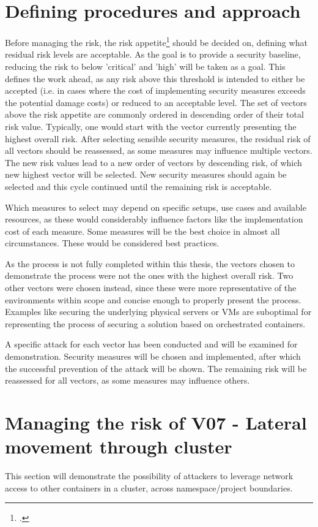\section{Defining procedures and approach} \label{riskMgmtApproach}
Before managing the risk, the risk appetite\footcite[][, first paragraph]{riskAppetite} should be decided on, defining what residual risk levels are acceptable.
As the goal is to provide a security baseline, reducing the risk to below 'critical' and 'high' will be taken as a goal.
This defines the work ahead, as any risk above this threshold is intended to either be accepted (i.e. in cases where the cost of implementing security measures exceeds the potential damage costs) or reduced to an acceptable level.
The set of vectors above the risk appetite are commonly ordered in descending order of their total risk value.
Typically, one would start with the vector currently presenting the highest overall risk. 
After selecting sensible security measures, the residual risk of all vectors should be reassessed, as some measures may influence multiple vectors. 
The new risk values lead to a new order of vectors by descending risk, of which new highest vector will be selected. New security measures should again be selected and this cycle continued until the remaining risk is acceptable.

Which measures to select may depend on specific setups, use cases and available resources, as these would considerably influence factors like the implementation cost of each measure. Some measures will be the best choice in almost all circumstances. These would be considered best practices.

As the process is not fully completed within this thesis, the vectors chosen to demonstrate the process were not the ones with the highest overall risk.
Two other vectors were chosen instead, since these were more representative of the environments within scope and concise enough to properly present the process. Examples like securing the underlying physical servers or VMs are suboptimal for representing the process of securing a solution based on orchestrated containers.

A specific attack for each vector has been conducted and will be examined for demonstration. Security measures will be chosen and implemented, after which the successful prevention of the attack will be shown.
The remaining risk will be reassessed for all vectors, as some measures may influence others.

\section{Managing the risk of V07 - Lateral movement through cluster} \label{v07ManageTotal}
This section will demonstrate the possibility of attackers to leverage network access to other containers in a cluster, across namespace/project boundaries.

